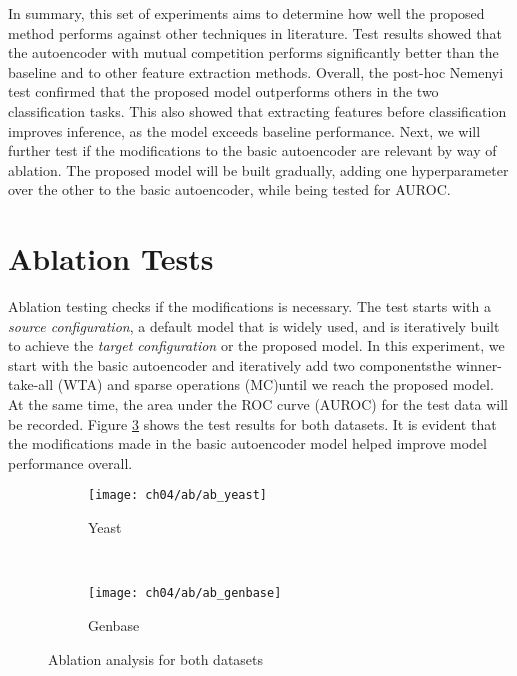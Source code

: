 \par In summary, this set of experiments aims to determine how well the
proposed method performs against other techniques in literature. Test results
showed that the autoencoder with mutual competition performs significantly
better than the baseline and to other feature extraction methods. Overall, the
post-hoc Nemenyi test confirmed that the proposed model outperforms others in
the two classification tasks. This also showed that extracting features before
classification improves inference, as the model exceeds baseline performance.
Next, we will further test if the modifications to the basic autoencoder are
relevant by way of ablation. The proposed model will be built gradually,
adding one hyperparameter over the other to the basic autoencoder, while being
tested for AUROC.  




\section{Ablation Tests}
\label{AblationTest}

\par Ablation testing checks if the modifications is necessary. The test starts
with a \textit{source configuration}, a default model that is widely used, and
is iteratively built to achieve the \textit{target configuration} or the
proposed model. In this experiment, we start with the basic autoencoder and
iteratively add two components\textemdash the winner-take-all (WTA) and sparse
operations (MC)\textemdash until we reach the proposed model. At the same time,
the area under the ROC curve (AUROC) for the test data will be recorded. Figure
\ref{results:ab_analysis} shows the test results for both datasets. It is
evident that the modifications made in the basic autoencoder model helped
improve model performance overall.   

\begin{figure}[h]
    \centering
    \begin{subfigure}[b]{0.45\textwidth}
        \texttt{[image: ch04/ab/ab\_yeast]}
        \caption{Yeast}
        \label{results:ab_yeast}
    \end{subfigure}
    ~ %
    \begin{subfigure}[b]{0.45\textwidth}
        \texttt{[image: ch04/ab/ab\_genbase]}
        \caption{Genbase}
        \label{results:ab_genbase}
    \end{subfigure}
    \caption{Ablation analysis for both datasets}
    \label{results:ab_analysis}
\end{figure}
